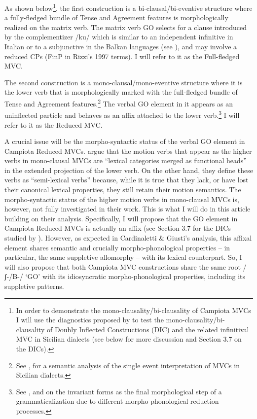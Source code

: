 \documentclass[output=paper]{langscibook}
\begin{document}
As shown below\footnote{In order to demonstrate the mono-clausality/bi-clausality of Campiota MVCs I will use the diagnostics proposed by \cite{cardinaletti2003a} to test the mono-clausality/bi-clausality of Doubly Inflected Constructions (DIC) and the related infinitival MVC in Sicilian dialects (see below for more discussion and Section 3.7 on the DICs).},  the first construction is a bi-clausal/bi-eventive structure where a fully-fledged bundle of Tense and Agreement features is morphologically realized on the matrix verb. The matrix verb GO selects for a clause introduced by the complementizer /ku/ which is similar to an independent infinitive in Italian or to a subjunctive in the Balkan languages (see \cite{calabrese1993a}), and may involve a reduced CPs (FinP in Rizzi’s 1997 terms).  I will refer to it as the Full-fledged MVC.

The second construction is a mono-clausal/mono-eventive structure where it is the lower verb that is morphologically marked with the full-fledged bundle of Tense and Agreement features.\footnote{See \cite{prete2020a}, \cite{todaro2018a} for a semantic analysis of the single event interpretation of MVCs in Sicilian dialects.}  The verbal GO element in it appears as an uninflected particle and behaves as an affix attached to the lower verb.\footnote{See \cite{cruschina2013a}, \cite{cruschina2021a} and \cite{ledgeway2016a} on the invariant forms as the final morphological step of a grammaticalization due to different morpho-phonological reduction processes.}  I will refer to it as the Reduced MVC.   

A crucial issue will be the morpho-syntactic status of the verbal GO element in Campiota Reduced MVCs. \cite{cardinaletti2003a} argue that the motion verbs that appear as the higher verbs in mono-clausal MVCs are “lexical categories merged as functional heads” in the extended projection of the lower verb. On the other hand, they define these verbs as “semi-lexical verbs” because, while it is true that they lack, or have lost their canonical lexical properties, they still retain their motion semantics. The morpho-syntactic status of the higher motion verbs in mono-clausal MVCs is, however, not fully investigated in their work.  This is what I will do in this article building on their analysis.  Specifically, I will propose that the GO element in Campiota Reduced MVCs is actually an affix (see Section 3.7 for the DICs studied by \cite{cardinaletti2003a}). However, as expected in Cardinaletti \& Giusti’s analysis, this affixal element shares semantic and crucially morpho-phonological properties -- in particular, the same suppletive allomorphy --  with its lexical counterpart.  So, I will also propose that both Campiota MVC constructions share the same root /ʃ-/B-/ ‘GO’ with its idiosyncratic morpho-phonological properties, including its suppletive patterns. 
\end{document}
